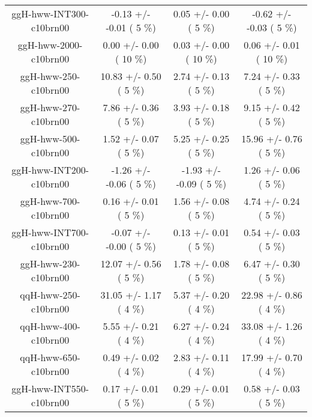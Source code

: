 \begin{table}[h!]
\begin{center}
{\begin{tabular}{
c| c | c | c | }
 ggH-hww-INT300-c10brn00   &      -0.13 +/-      -0.01 (         5 \%)   &       0.05 +/-       0.00 (         5 \%)   &      -0.62 +/-      -0.03 (         5 \%)  \\
 ggH-hww-2000-c10brn00   &       0.00 +/-       0.00 (        10 \%)   &       0.03 +/-       0.00 (        10 \%)   &       0.06 +/-       0.01 (        10 \%)  \\
 ggH-hww-250-c10brn00   &      10.83 +/-       0.50 (         5 \%)   &       2.74 +/-       0.13 (         5 \%)   &       7.24 +/-       0.33 (         5 \%)  \\
 ggH-hww-270-c10brn00   &       7.86 +/-       0.36 (         5 \%)   &       3.93 +/-       0.18 (         5 \%)   &       9.15 +/-       0.42 (         5 \%)  \\
 ggH-hww-500-c10brn00   &       1.52 +/-       0.07 (         5 \%)   &       5.25 +/-       0.25 (         5 \%)   &      15.96 +/-       0.76 (         5 \%)  \\
 ggH-hww-INT200-c10brn00   &      -1.26 +/-      -0.06 (         5 \%)   &      -1.93 +/-      -0.09 (         5 \%)   &       1.26 +/-       0.06 (         5 \%)  \\
 ggH-hww-700-c10brn00   &       0.16 +/-       0.01 (         5 \%)   &       1.56 +/-       0.08 (         5 \%)   &       4.74 +/-       0.24 (         5 \%)  \\
 ggH-hww-INT700-c10brn00   &      -0.07 +/-      -0.00 (         5 \%)   &       0.13 +/-       0.01 (         5 \%)   &       0.54 +/-       0.03 (         5 \%)  \\
 ggH-hww-230-c10brn00   &      12.07 +/-       0.56 (         5 \%)   &       1.78 +/-       0.08 (         5 \%)   &       6.47 +/-       0.30 (         5 \%)  \\
 qqH-hww-250-c10brn00   &      31.05 +/-       1.17 (         4 \%)   &       5.37 +/-       0.20 (         4 \%)   &      22.98 +/-       0.86 (         4 \%)  \\
 qqH-hww-400-c10brn00   &       5.55 +/-       0.21 (         4 \%)   &       6.27 +/-       0.24 (         4 \%)   &      33.08 +/-       1.26 (         4 \%)  \\
 qqH-hww-650-c10brn00   &       0.49 +/-       0.02 (         4 \%)   &       2.83 +/-       0.11 (         4 \%)   &      17.99 +/-       0.70 (         4 \%)  \\
 ggH-hww-INT550-c10brn00   &       0.17 +/-       0.01 (         5 \%)   &       0.29 +/-       0.01 (         5 \%)   &       0.58 +/-       0.03 (         5 \%)  \\

\end{tabular}}
\end{center}
\end{table}
